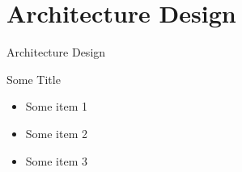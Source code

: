 \setlength{\parskip}{\baselineskip}
\section{Architecture Design}

\begin{frame}
	\huge Architecture Design
\end{frame}

\begin{frame}{Some Title}
	\begin{itemize}
		\item Some item 1
		\item Some item 2
		\item Some item 3
	\end{itemize}
\end{frame}
